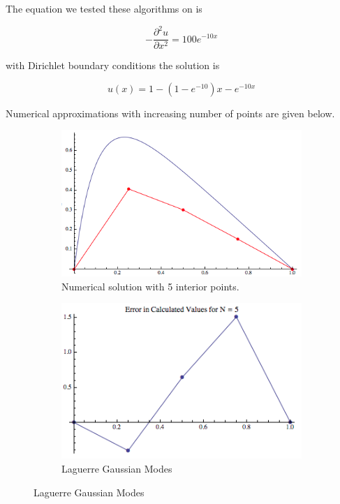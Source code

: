 \documentclass{article}
\begin{document}
The equation we tested these algorithms on is

\begin{equation}
- \frac{\partial^2 u}{\partial x^2} = 100 e^{-10x}
\end{equation}

with Dirichlet boundary conditions the solution is

\begin{equation}
u(x) = 1 - \left( 1 - e^{-10} \right) x - e^{-10x}
\end{equation}

Numerical approximations with increasing number of points are given below.

\begin{figure}[H]
	\centering
	\begin{subfigure}{.5\textwidth}
  		\centering
  		\includegraphics[width=.9\linewidth]{solutionN5}
  		\caption{Numerical solution with 5 interior points. \label{fig: hermite gaussian modes}}
	\end{subfigure}%
	\begin{subfigure}{.5\textwidth}
  		\centering
  		\includegraphics[width=.9\linewidth]{solutionErrorN5}
  		\caption{Laguerre Gaussian Modes \label{fig:  laguerre gaussian modes}}
	\end{subfigure}
	
\end{figure}
\end{document}
